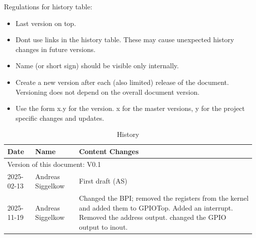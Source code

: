 Regulations for history table:
\begin{itemize}
  \item Last version on top.
  \item Dont use links in the history table. These may cause unexpected history changes in future versions.
  \item Name (or short sign) should be visible only internally.
  \item Create a new version after each (also limited) release of the document. Versioning does not depend on the overall document version.
  \item Use the form x.y for the version. x for the master versions, y for the project specific changes and updates.
\end{itemize}

\begin{table}[H]
\caption{History}
\label{tab:gpiohistory01a}
\centering
\begin{tabularx}{\textwidth}{|X |X |X |}
  \hline
  Date & Name & Content Changes \\
  \hline
  \multicolumn{3}{|l|}{Version of this document: V0.1} \\
  \hline
  2025-02-13 & Andreas Siggelkow & First draft (AS) \\
   \hline
  2025-11-19 & Andreas Siggelkow & Changed the BPI; removed the registers from the kernel and added them to GPIOTop. Added an interrupt. Removed the address output. changed the GPIO output to inout. \\
  \hline
\end{tabularx}
\end{table}
